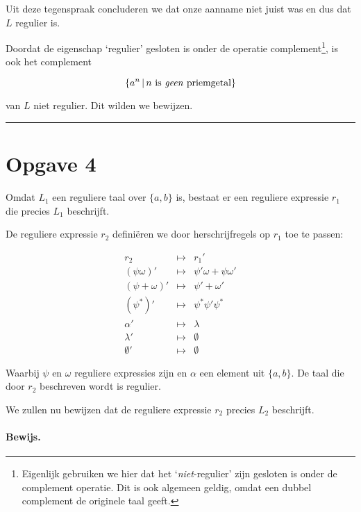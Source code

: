 \documentclass[a4paper,11pt]{article}
\begin{document}
Uit deze tegenspraak concluderen we dat onze aanname niet juist was en dus
dat $L$ regulier is.

Doordat de eigenschap `regulier' gesloten is onder de operatie
complement\footnote{Eigenlijk gebruiken we hier dat het `\emph{niet}-regulier'
zijn gesloten is onder de complement operatie. Dit is ook algemeen geldig,
omdat een dubbel complement de originele taal geeft.}, is ook het complement

\begin{displaymath}
\{a^{n} \, | \, n \mbox{ is \emph{geen} priemgetal}\}
\end{displaymath}

van $L$ niet regulier. Dit wilden we bewijzen.

\hfill\rule{2.1mm}{2.mm}


\section*{Opgave 4}


Omdat $L_{1}$ een reguliere taal over $\{a,b\}$ is, bestaat er een reguliere
expressie $r_{1}$ die precies $L_{1}$ beschrijft.

De reguliere expressie $r_{2}$ defini\"eren we door herschrijfregels op
$r_{1}$ toe te passen:

\begin{eqnarray}
r_{2} & \mapsto & r_{1}' \label{regel:regex} \\
(\psi \omega)' & \mapsto & \psi' \omega + \psi \omega' \label{regel:con} \\
(\psi + \omega)' & \mapsto & \psi' + \omega' \label{regel:keuze} \\
(\psi^{*})' & \mapsto & \psi^{*} \psi' \psi^{*} \label{regel:herh} \\
\alpha' & \mapsto & \lambda \label{regel:atom} \\
\lambda' & \mapsto & \emptyset \label{regel:lambda} \\
\emptyset' & \mapsto & \emptyset \label{regel:empty}
\end{eqnarray}

Waarbij $\psi$ en $\omega$ reguliere expressies zijn en $\alpha$ een
element uit $\{a,b\}$. De taal die door $r_{2}$ beschreven wordt
is regulier.

We zullen nu bewijzen dat de reguliere expressie $r_{2}$ precies $L_{2}$
beschrijft.

\paragraph{Bewijs.}
\end{document}
